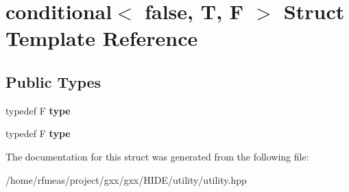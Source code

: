 \hypertarget{structconditional_3_01false_00_01T_00_01F_01_4}{}\section{conditional$<$ false, T, F $>$ Struct Template Reference}
\label{structconditional_3_01false_00_01T_00_01F_01_4}
\subsection*{Public Types}
\begin{DoxyCompactItemize}
\item 
typedef F {\bfseries type}\hypertarget{structconditional_3_01false_00_01T_00_01F_01_4_a30fb52a7232e2c1c70a4f608a6154b45}{}\label{structconditional_3_01false_00_01T_00_01F_01_4_a30fb52a7232e2c1c70a4f608a6154b45}

\item 
typedef F {\bfseries type}\hypertarget{structconditional_3_01false_00_01T_00_01F_01_4_a30fb52a7232e2c1c70a4f608a6154b45}{}\label{structconditional_3_01false_00_01T_00_01F_01_4_a30fb52a7232e2c1c70a4f608a6154b45}

\end{DoxyCompactItemize}


The documentation for this struct was generated from the following file\+:\begin{DoxyCompactItemize}
\item 
/home/rfmeas/project/gxx/gxx/\+H\+I\+D\+E/utility/utility.\+hpp\end{DoxyCompactItemize}
